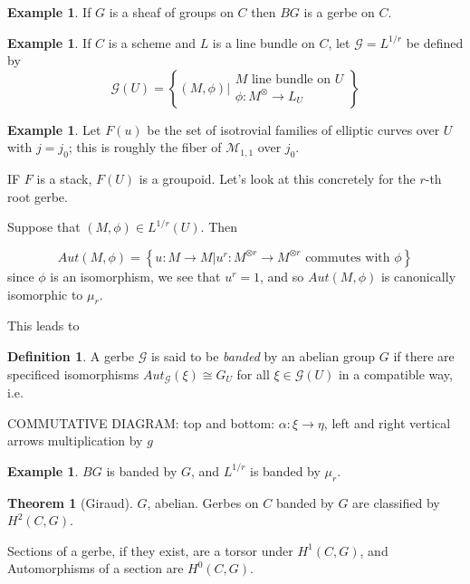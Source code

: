\documentclass{amsart}
\theoremstyle{definition}
\newtheorem{theorem}[dummy]{Theorem}
\newtheorem{definition}[dummy]{Definition}
\newtheorem{example}[dummy]{Example}
\newcommand{\M}{\mathcal{M}}
\newcommand{\Aut}{Aut}
\begin{document}
\begin{example}
If $G$ is a sheaf of groups on $C$ then $BG$ is a gerbe on $C$.
\end{example}

\begin{example}
If $C$ is a scheme and $L$ is a line bundle on $C$, let $\mathcal{G}=L^{1/r}$ be defined by 
$$\mathcal{G}(U)=\left\{(M,\phi)\Bigg| \begin{array}{l} M \text{ line bundle on $U$} \\ \phi:M^{\otimes}\to L_U
  \end{array}\right\}$$
\end{example}


\begin{example}
Let $F(u)$ be the set of isotrovial families of elliptic curves over $U$ with $j=j_0$; this is roughly the fiber of $\M_{1,1}$ over $j_0$.
\end{example}

IF $F$ is a stack, $F(U)$ is a groupoid.  Let's look at this concretely for the $r$-th root gerbe.

Suppose that $(M,\phi)\in L^{1/r}(U)$.
Then

$$\Aut(M,\phi)=\left\{u:M\to M| u^r:M^{\otimes r}\to M^{\otimes r} \text{ commutes with $\phi$}\right\}$$
since $\phi$ is an isomorphism, we see that $u^r=1$, and so $\Aut(M,\phi)$ is canonically isomorphic to $\mu_r$.

This leads to
\begin{definition}
A gerbe $\mathcal{G}$ is said to be \emph{banded} by an abelian group $G$ if there are specificed isomorphisms $\Aut_{\mathcal{G}}(\xi)\cong G_U$ for all $\xi\in\mathcal{G}(U)$ in a compatible way, i.e.

COMMUTATIVE DIAGRAM: top and bottom: $\alpha:\xi\to\eta$, left and right vertical arrows multiplication by $g$
\end{definition}


\begin{example}
$BG$ is banded by $G$, and $L^{1/r}$ is banded by $\mu_r$.
\end{example}


\begin{theorem}[Giraud]
$G$, abelian.  Gerbes on $C$ banded by $G$ are classified by $H^2(C,G)$.

Sections of a gerbe, if they exist, are a torsor under $H^1(C,G)$, and Automorphisms of a section are $H^0(C,G)$.
\end{theorem}
\end{document}
